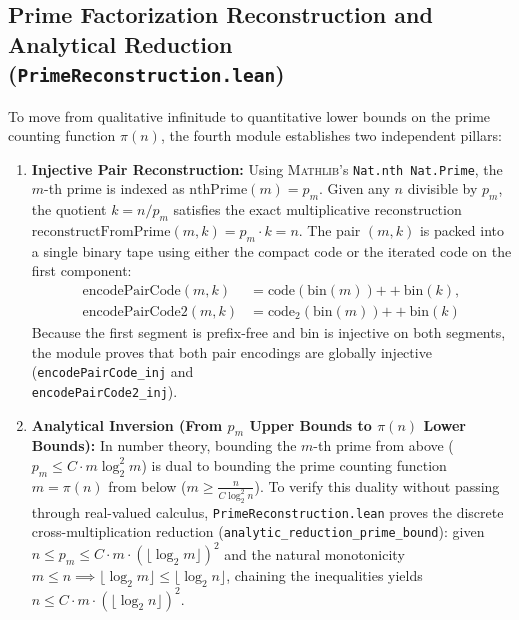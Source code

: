\documentclass[acmsmall,natbib=false,nonacm]{acmart}
\begin{document}
\subsection{Prime Factorization Reconstruction and Analytical Reduction (\texttt{PrimeReconstruction.lean})}
To move from qualitative infinitude to quantitative lower bounds on the prime counting function $\pi(n)$, the fourth module establishes two independent pillars:
\begin{enumerate}
    \item \textbf{Injective Pair Reconstruction:} Using \textsc{Mathlib}'s \texttt{Nat.nth Nat.Prime}, the $m$-th prime is indexed as $\text{nthPrime}(m) = p_m$. Given any $n$ divisible by $p_m$, the quotient $k = n / p_m$ satisfies the exact multiplicative reconstruction $\text{reconstructFromPrime}(m, k) = p_m \cdot k = n$. The pair $(m, k)$ is packed into a single binary tape using either the compact code or the iterated code on the first component:
    \begin{equation}
        \begin{aligned}
          \text{encodePairCode}(m, k) &= \text{code}(\text{bin}(m)) \mathbin{+\!+} \text{bin}(k), \\
          \text{encodePairCode2}(m, k) &= \text{code}_2(\text{bin}(m)) \mathbin{+\!+} \text{bin}(k)
        \end{aligned}
    \end{equation}
    Because the first segment is prefix-free and $\text{bin}$ is injective on both segments, the module proves that both pair encodings are globally injective (\texttt{encodePairCode\_inj} and \\
    \texttt{encodePairCode2\_inj}).

    \item \textbf{Analytical Inversion (From $p_m$ Upper Bounds to $\pi(n)$ Lower Bounds):} In number theory, bounding the $m$-th prime from above ($p_m \le C \cdot m \log_2^2 m$) is dual to bounding the prime counting function $m = \pi(n)$ from below ($m \ge \frac{n}{C \log_2^2 n}$). To verify this duality without passing through real-valued calculus, \texttt{PrimeReconstruction.lean} proves the discrete cross-multiplication reduction (\texttt{analytic\_reduction\_prime\_bound}): given $n \le p_m \le C \cdot m \cdot (\lfloor\log_2 m\rfloor)^2$ and the natural monotonicity $m \le n \implies \lfloor\log_2 m\rfloor \le \lfloor\log_2 n\rfloor$, chaining the inequalities yields $n \le C \cdot m \cdot (\lfloor\log_2 n\rfloor)^2$.
\end{enumerate}
\end{document}
